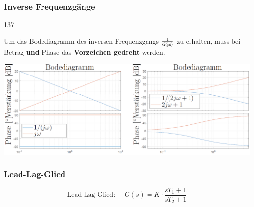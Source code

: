 


\subsubsection{Inverse Frequenzgänge}{137}

Um das Bodediagramm des inversen Frequenzgangs $\frac{1}{G(\mathrm{j} \omega)}$ zu erhalten, muss bei Betrag \textbf{und} Phase
das \textbf{Vorzeichen gedreht} werden.
\vspace{0.2cm}
 
\includegraphics[width=\columnwidth]{images/inverse_frequenzgaenge.png}


\subsubsection{Lead-Lag-Glied}
\label{Lead-Lag-Glied}

$$ \boxed{ \text{Lead-Lag-Glied: } \quad G(s) = K \cdot \frac{s T_1 + 1}{s T_2 + 1} } $$

